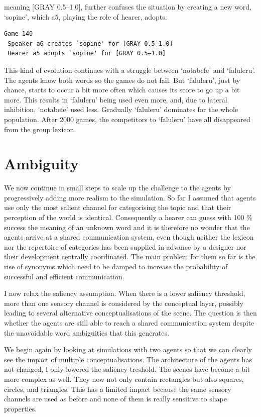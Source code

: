 meaning [GRAY 0.5–1.0], further confuses the situation by 
creating a new word, `sopine', which {\bfshape  a5}, playing
the role of hearer, adopts. 
\begin{verbatim}
Game 140
 Speaker a6 creates `sopine' for [GRAY 0.5–1.0]
 Hearer a5 adopts `sopine' for [GRAY 0.5–1.0]
\end{verbatim}
This kind of evolution continues with a struggle between 
`notabefe' and `faluleru'. The agents know both 
words so the games do not fail. But `faluleru', 
just by chance, starts to occur a bit more often
which causes its score to go up a bit more. 
This results in `faluleru' being used even more, 
and, due to lateral inhibition, `notabefe' used 
less. Gradually `faluleru' dominates for 
the whole population. 
After 2000 games, the competitors to `faluleru' have 
all disappeared from the group lexicon. 

\section{Ambiguity} 

We now continue in small steps to scale up the
challenge to the agents by progressively 
adding more realism to the simulation. So far I 
assumed that agents use only 
the most salient channel for categorising the topic
and that their perception of the world is identical.
Consequently a hearer can guess with 100 \% success the
meaning of an unknown word and 
it is therefore no wonder that the agents arrive at a 
shared communication system, 
even though neither the lexicon nor the repertoire
of categories has been supplied in advance by a 
designer nor their development centrally
coordinated. The main problem for them so far is 
the rise of synonyms which need to be damped to 
increase the probability of successful and 
efficient communication. 

I now relax the saliency assumption. When 
there is a lower saliency threshold, more than one
sensory channel is considered by the conceptual 
layer, possibly leading to several alternative
conceptualisations of the scene. The question is 
then whether the agents are still able to reach 
a shared communication system despite the unavoidable
word ambiguities that this generates. 

We begin again by looking at simulations
with two agents so that we 
can clearly see the impact of multiple conceptualisations. 
The architecture of the agents has not changed, I only 
lowered the saliency treshold. 
The scenes have become a bit more complex as well. They 
now not only contain rectangles but also squares, circles, 
and triangles. This has a limited impact because the 
same sensory channels are used as before and none of them 
is really sensitive to shape properties. 


